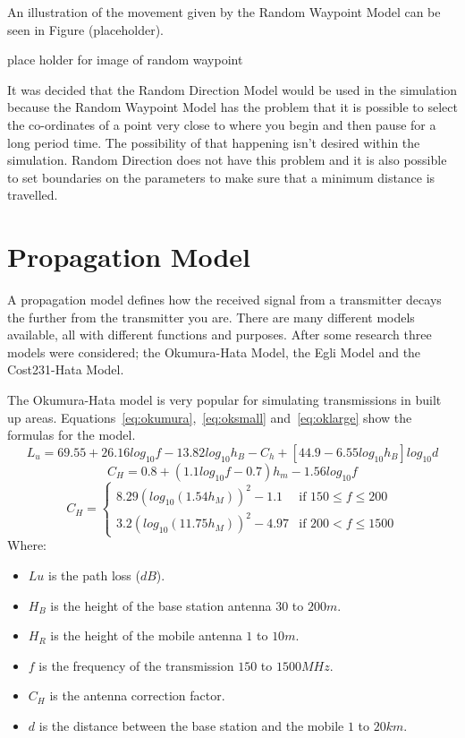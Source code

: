 An illustration of the movement given by the Random Waypoint Model can be seen in Figure (placeholder).

place holder for image of random waypoint

It was decided that the Random Direction Model would be used in the simulation because the Random Waypoint Model has the problem that it is possible to select the co-ordinates of a point very close to where you begin and then pause for a long period time. The possibility of that happening isn’t desired within the simulation. Random Direction does not have this problem and it is also possible to set boundaries on the parameters to make sure that a minimum distance is travelled.~\cite{roy2010handbook}

\section{Propagation Model}\label{propagation}
A propagation model defines how the received signal from a transmitter decays the further from the transmitter you are. There are many different models available, all with different functions and purposes. After some research three models were considered; the Okumura-Hata Model, the Egli Model and the Cost231-Hata Model.

The Okumura-Hata model is very popular for simulating transmissions in built up areas. Equations~\ref{eq:okumura},~\ref{eq:oksmall} and~\ref{eq:oklarge} show the formulas for the model.
\begin{equation}\label{eq:okumura}
L_{u}=69.55+26.16log_{10}f-13.82log_{10}h_{B}-C_{h}+[44.9-6.55log_{10}h_{B}]log_{10}d 
\end{equation}
\begin{equation}\label{eq:oksmall}
C_{H}=0.8+(1.1log_{10}f-0.7)h_{m}-1.56log_{10}f
\end{equation}
\begin{equation}\label{eq:oklarge}
C_{H}=
	\begin{cases}
	8.29(log_{10}(1.54h_{M}))^{2}-1.1 & \mbox{if } 150 \leq f \leq 200 \\
	3.2(log_{10}(11.75h_{M}))^{2}-4.97 & \mbox{if } 200 < f \leq 1500
	\end{cases}
\end{equation}
Where:
\begin{itemize}
\item $Lu$ is the path loss ($dB$).
\item $H_{B}$ is the height of the base station antenna $30$ to $200 m$.
\item $H_{R}$ is the height of the mobile antenna $1$ to $10 m$.
\item $f$ is the frequency of the transmission $150$ to $1500 MHz$.
\item $C_{H}$ is the antenna correction factor.
\item $d$ is the distance between the base station and the mobile $1$ to $20 km$.
\end{itemize}

